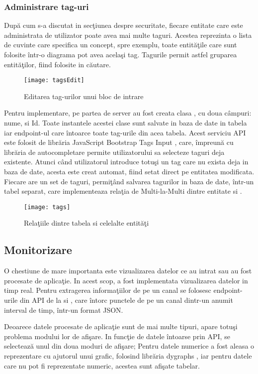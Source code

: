 \subsubsection{Administrare tag-uri}
După cum s-a discutat in secţiunea despre securitate, fiecare entitate care este administrata de utilizator poate avea mai multe taguri. Acestea reprezinta o lista de cuvinte care specifica un concept, spre exemplu, toate entităţile care sunt folosite într-o diagrama pot avea acelaşi tag. Tagurile permit astfel gruparea entităţilor, fiind folosite in căutare.
\begin{figure}[H]
	\centering
	\texttt{[image: tagsEdit]}
	\caption{Editarea tag-urilor unui bloc de intrare}
	\label{fig:tagsEdit}
\end{figure}
Pentru implementare, pe partea de server au fost creata clasa , cu doua câmpuri: nume, si Id. Toate instantele acestei clase sunt salvate in baza de date in tabela  iar endpoint-ul  care întoarce toate tag-urile din acea tabela. Acest serviciu API este folosit de librăria JavaScript  Bootstrap Tags Input \autocite{tagsinput}, care, împreună cu librăria de autocompletare \autocite{typeahead} permite utilizatorului sa selecteze taguri deja existente. Atunci când utilizatorul introduce totuşi un tag care nu exista deja in baza de date, acesta este creat automat, fiind setat direct pe entitatea modificata. Fiecare  are un set de taguri, permiţând salvarea tagurilor in baza de date, într-un tabel separat, care implementeaza relaţia de Multi-la-Multi dintre entitate si .
\begin{figure}[H]
	\centering
	\texttt{[image: tags]}
	\caption{Relaţiile dintre tabela  si celelalte entităţi}
	\label{fig:tags}
\end{figure}
\subsection{Monitorizare}
O chestiune de mare importanta este vizualizarea datelor ce au intrat sau au fost procesate de aplicaţie. In acest scop, a fost implementata vizualizarea datelor in timp real. Pentru extragerea informaţiilor de pe un canal se folosesc endpoint-urile din API de la  si , care întorc punctele de pe un canal dintr-un anumit interval de timp, într-un format JSON.

Deoarece datele procesate de aplicaţie sunt de mai multe tipuri, apare totuşi problema modului lor de afişare. In funcţie de datele întoarse prin API, se selectează unul din doua moduri de afişare; Pentru datele numerice a fost aleasa o reprezentare cu ajutorul unui grafic, folosind librăria dygraphs \autocite{dygraphs}, iar pentru datele care nu pot fi reprezentate numeric, acestea sunt afişate tabelar.

